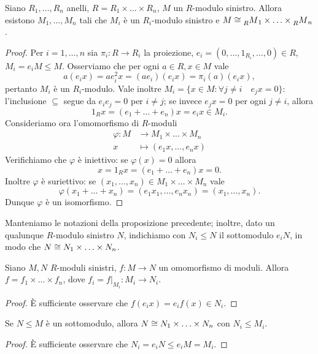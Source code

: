 \begin{proposition}
Siano $R_1,\ldots,R_n$ anelli, $R=R_1\times\ldots\times R_n$, $M$ un $R$-modulo sinistro. Allora esistono $M_1,\ldots,M_n$ tali che $M_i$ è un $R_i$-modulo sinistro e $M\cong \prescript{}{R}{M}_1\times\ldots\times \prescript{}{R}{M}_n$.
\end{proposition}
\begin{proof}
Per $i=1,\ldots, n$ sia $\pi_i:R\to R_i$ la proiezione, $e_i=(0,\ldots,1_{R_i},\ldots,0)\in R$, $M_i=e_iM\le M$. Osserviamo che per ogni $a\in R\comma x\in M$ vale
$$
a(e_ix)=ae_i^2x=(ae_i)(e_ix)=\pi_i(a)(e_ix),
$$
pertanto $M_i$ è un $R_i$-modulo. Vale inoltre $M_i=\{x\in M:\forall j\neq i\quad e_jx=0\}$: l'inclusione $\subseteq$ segue da $e_ie_j=0$ per $i\neq j$; se invece $e_jx=0$ per ogni $j\neq i$, allora
$$
1_Rx=(e_1+\ldots+e_n)x=e_ix\in M_i.
$$
Consideriamo ora l'omomorfismo di $R$-moduli
\begin{align*}
\varphi:M&\longrightarrow M_1\times\ldots\times M_n\\
x&\longmapsto (e_1x,\ldots,e_nx)
\end{align*}
Verifichiamo che $\varphi$ è iniettivo: se $\varphi(x)=0$ allora
$$
x=1_Rx=(e_1+\ldots+e_n)x=0.
$$
Inoltre $\varphi$ è suriettivo: se $(x_1,\ldots,x_n)\in M_1\times\ldots\times M_n$ vale
$$
\varphi(x_1+\ldots+x_n)=(e_1x_1,\ldots,e_nx_n)=(x_1,\ldots,x_n).
$$
Dunque $\varphi$ è un isomorfismo.
\end{proof}
Manteniamo le notazioni della proposizione precedente; inoltre, dato un qualunque $R$-modulo sinistro $N$, indichiamo con $N_i\le N$ il sottomodulo $e_iN$, in modo che $N\cong N_1\times\ldots\times N_n$.


\begin{corollary}
Siano $M,N$ $R$-moduli sinistri, $f:M\to N$ un omomorfismo di moduli. Allora $f=f_1\times\ldots\times f_n$, dove $f_i=f|_{M_i}:M_i\to N_i$.
\end{corollary}
\begin{proof}
È sufficiente osservare che $f(e_ix)=e_if(x)\in N_i$.
\end{proof}

\begin{corollary}
Se $N\le M$ è un sottomodulo, allora $N\cong N_1\times\ldots\times N_n$ con $N_i\le M_i$.
\end{corollary}
\begin{proof}
È sufficiente osservare che $N_i=e_iN\le e_iM=M_i$. 
\end{proof}


